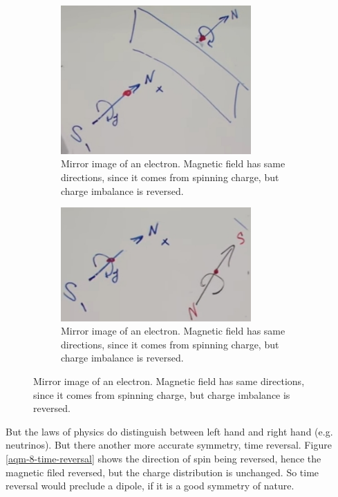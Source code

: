 \documentclass[]{article}
\begin{document}
\begin{figure}[H]
	\caption{Symmetries and dipoles}
	\begin{subfigure}[t]{0.45\textwidth}
		\caption[Mirror image of an electron]{Mirror image of an electron. Magnetic field has same directions, since it comes from spinning charge, but charge imbalance is reversed.}\label{fig:aqm-8-mirror-image}
		\includegraphics[width=0.8\textwidth]{aqm-8-mirror-image}
	\end{subfigure}
	\begin{subfigure}[t]{0.45\textwidth}
		\caption[Mirror image of an electron]{Mirror image of an electron. Magnetic field has same directions, since it comes from spinning charge, but charge imbalance is reversed.}\label{fig:aqm-8-time-reversal}
		\includegraphics[width=0.8\textwidth]{aqm-8-time-reversal}
	\end{subfigure}
\end{figure}

But the laws of physics do distinguish between left hand and right hand (e.g. neutrinos). But there another more accurate symmetry, time reversal.  Figure \ref{aqm-8-time-reversal} shows the direction of spin being reversed, hence the magnetic filed reversed, but the charge distribution is unchanged. So time reversal would preclude a dipole, if it is a good symmetry of nature.
\end{document}
